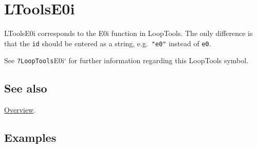 \documentclass[../FeynHelpersManual.tex]{subfiles}
\begin{document}
\hypertarget{ltoolse0i}{
\section{LToolsE0i}\label{ltoolse0i}}

LToolsE0i corresponds to the E0i function in LoopTools. The only
difference is that the \texttt{id} should be entered as a string,
e.g.~\texttt{"e0"} instead of \texttt{e0}.

See \texttt{?LoopTools}E0i` for further information regarding this
LoopTools symbol.

\subsection{See also}

\hyperlink{toc}{Overview}.

\subsection{Examples}
\end{document}
